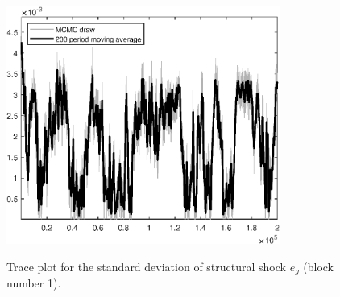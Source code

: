 \begin{figure}[H]
\centering
  \includegraphics[width=0.8\textwidth]{BRS_sectoral_rest/graphs/TracePlot_SE_e_g_blck_1}\\
    \caption{Trace plot for the standard deviation of structural shock ${e_g}$ (block number 1).}
\end{figure}
